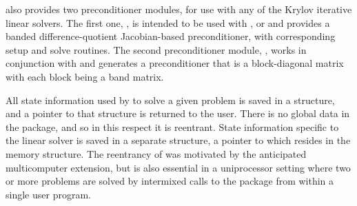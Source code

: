 {\cvode} also provides two preconditioner modules, for use with any of
the Krylov iterative linear solvers. The first one, {\cvbandpre},
is intended to be used with {\nvecs}, {\nvecopenmp} or {\nvecpthreads}
and provides a banded difference-quotient Jacobian-based
preconditioner, with corresponding setup and solve routines.
The second preconditioner module, {\cvbbdpre}, works in conjunction
with {\nvecp} and generates a preconditioner that is a block-diagonal
matrix with each block being a band matrix.

All state information used by {\cvode} to solve a given problem is saved
in a structure, and a pointer to that structure is returned to the
user.  There is no global data in the {\cvode} package, and so in this
respect it is reentrant. State information specific to the linear
solver is saved in a separate structure, a pointer to which resides in
the {\cvode} memory structure. The reentrancy of {\cvode} was motivated
by the anticipated multicomputer extension, but is also essential
in a uniprocessor setting where two or more problems are solved by
intermixed calls to the package from within a single user program.

